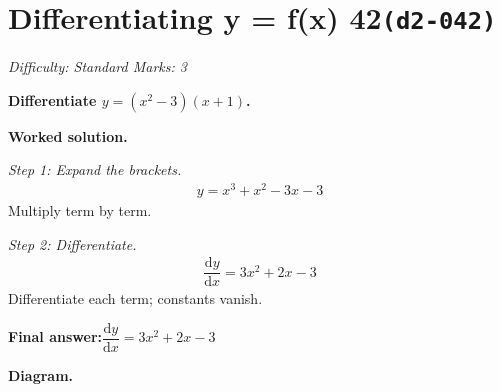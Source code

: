 \documentclass[11pt]{article}
\newcommand{\question}[1]{\par\medskip\noindent\textbf{#1}\par}
\begin{document}
\section*{Differentiating y = f(x) 42\quad\small\texttt{(d2-042)}}
\textit{Difficulty: Standard \quad\textbar\quad Marks: 3}

\question{Differentiate \( y = (x^2 - 3)(x + 1) \).}

\textbf{Worked solution.}

\textit{Step 1: Expand the brackets.}
\[\begin{gathered}
y = x^3 + x^2 - 3x - 3
\end{gathered}\]
Multiply term by term.

\textit{Step 2: Differentiate.}
\[\begin{gathered}
\dfrac{\mathrm{d}y}{\mathrm{d}x} = 3x^2 + 2x - 3
\end{gathered}\]
Differentiate each term; constants vanish.

\begin{answerbox}
\textbf{Final answer:}\quad \(\displaystyle  \dfrac{\mathrm{d}y}{\mathrm{d}x} = 3x^2 + 2x - 3 \)
\end{answerbox}
\textbf{Diagram.}
\end{document}
